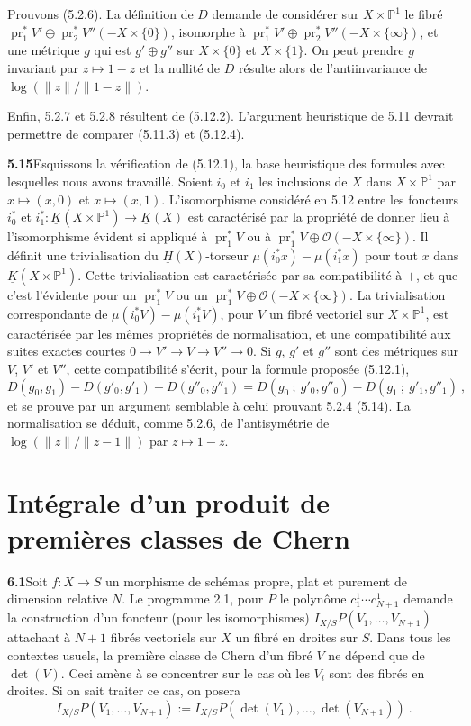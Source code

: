 \documentclass[12pt,a4paper]{article}
\theoremstyle{plain}
\theoremstyle{definition}
\theoremstyle{remark}
\newcommand{\bbP}{\mathbb{P}}
\newcommand{\calO}{\mathcal{O}}
\DeclareMathOperator{\pr}{pr}
\newcommand{\ubK}{\underline{K}}
\newcommand{\ubH}{\underline{H}}
\begin{document}
Prouvons (5.2.6). La d\'efinition de $D$ demande de consid\'erer sur $X \times \bbP^1$ le fibr\'e $\pr_1^*V' \oplus \pr_2^*V''(-X \times \{0\})$, isomorphe \`a $\pr_1^*V' \oplus \pr_2^*V''(-X \times \{\infty\})$, et une m\'etrique $g$ qui est $g' \oplus g''$ sur $X \times \{0\}$ et $X \times \{1\}$. On peut prendre $g$ invariant par $z \mapsto 1-z$ et la nullit\'e de $D$ r\'esulte alors de l'antiinvariance de $\log(\|z\|/\|1-z\|)$.

Enfin, 5.2.7 et 5.2.8 r\'esultent de (5.12.2). L'argument heuristique de 5.11 devrait permettre de comparer (5.11.3) et (5.12.4).

\medskip
\noindent\textbf{5.15}\quad Esquissons la v\'erification de (5.12.1), la base heuristique des formules avec lesquelles nous avons travaill\'e. Soient $i_0$ et $i_1$ les inclusions de $X$ dans $X \times \bbP^1$ par $x \mapsto (x,0)$ et $x \mapsto (x,1)$. L'isomorphisme consid\'er\'e en 5.12 entre les foncteurs $i_0^*$ et $i_1^* : \ubK(X \times \bbP^1) \to \ubK(X)$ est caract\'eris\'e par la propri\'et\'e de donner lieu \`a l'isomorphisme \'evident si appliqu\'e \`a $\pr_1^*V$ ou \`a $\pr_1^*V \oplus \calO(-X \times \{\infty\})$. Il d\'efinit une trivialisation du $\ubH(X)$-torseur $\mu(i_0^*x) - \mu(i_1^*x)$ pour tout $x$ dans $\ubK(X \times \bbP^1)$. Cette trivialisation est caract\'eris\'ee par sa compatibilit\'e \`a $+$, et que c'est l'\'evidente pour un $\pr_1^*V$ ou un $\pr_1^*V \oplus \calO(-X \times \{\infty\})$. La trivialisation correspondante de $\mu(i_0^*V) - \mu(i_1^*V)$, pour $V$ un fibr\'e vectoriel sur $X \times \bbP^1$, est caract\'eris\'ee par les m\^emes propri\'et\'es de normalisation, et une compatibilit\'e aux suites exactes courtes $0 \to V' \to V \to V'' \to 0$. Si $g$, $g'$ et $g''$ sont des m\'etriques sur $V$, $V'$ et $V''$, cette compatibilit\'e s'\'ecrit, pour la formule propos\'ee (5.12.1),
\[
D(g_0, g_1) - D(g'_0, g'_1) - D(g''_0, g''_1) = D(g_0 \ ; \ g'_0, g''_0) - D(g_1 \ ; \ g'_1, g''_1) \ ,
\]
et se prouve par un argument semblable \`a celui prouvant 5.2.4 (5.14). La normalisation se d\'eduit, comme 5.2.6, de l'antisym\'etrie de $\log(\|z\|/\|z-1\|)$ par $z \mapsto 1-z$.


\section{Int\'egrale d'un produit de premi\`eres classes de Chern}

\noindent\textbf{6.1}\quad Soit $f: X \to S$ un morphisme de sch\'emas propre, plat et purement de dimension relative $N$. Le programme 2.1, pour $P$ le polyn\^ome $c_1^1 \cdots c_{N+1}^1$ demande la construction d'un foncteur (pour les isomorphismes) $I_{X/S} P(V_1, \ldots, V_{N+1})$ attachant \`a $N+1$ fibr\'es vectoriels sur $X$ un fibr\'e en droites sur $S$. Dans tous les contextes usuels, la premi\`ere classe de Chern d'un fibr\'e $V$ ne d\'epend que de $\det(V)$. Ceci am\`ene \`a se concentrer sur le cas o\`u les $V_i$ sont des fibr\'es en droites. Si on sait traiter ce cas, on posera
\begin{equation}
\label{eq:6.1.1}
I_{X/S} P(V_1, \ldots, V_{N+1}) := I_{X/S} P(\det(V_1), \ldots, \det(V_{N+1})) \ .
\end{equation}
\end{document}
